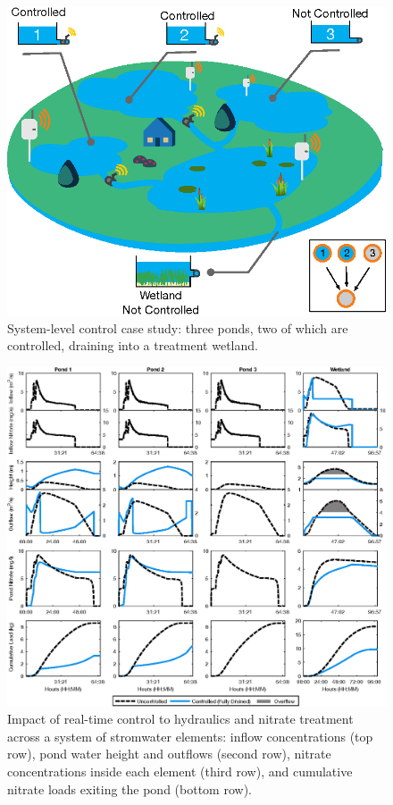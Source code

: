 \begin{figure}
\centering
 \includegraphics{gfx/Chapter-1/Glo_sys_rep.eps}
  \caption{System-level control case study: three ponds, two of which are controlled, draining into a treatment wetland.}
\label{fgr:sys_diagram}
\end{figure}

\begin{figure}
\includegraphics{gfx/Chapter-1/Global.eps}
  \caption{Impact of real-time control to hydraulics and nitrate treatment across a system of stromwater elements: inflow concentrations (top row), pond water height and outflows (second row), nitrate concentrations inside each element (third row), and cumulative nitrate loads exiting the pond (bottom row).}
\label{fgr:globalcase}
\end{figure}

